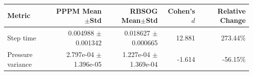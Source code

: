 \begin{tabular}{lrrrr}
\toprule
Metric & PPPM Mean$\pm$Std & RBSOG Mean$\pm$Std & Cohen's $d$ & Relative Change \\
\midrule
Step time & 0.004988 $\pm$ 0.001342 & 0.018627 $\pm$ 0.000665 & 12.881 & 273.44\% \\
Pressure variance & 2.797e-04 $\pm$ 1.396e-05 & 1.227e-04 $\pm$ 1.369e-04 & -1.614 & -56.15\% \\
\bottomrule
\end{tabular}
